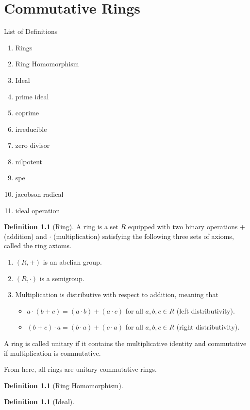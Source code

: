 \documentclass{book}
\theoremstyle{plain}
\theoremstyle{definition}
\theoremstyle{custom_definition}
\newtheorem{defn}[thm]{Definition}
\begin{document}
%
%
%
\chapter{Commutative Rings}

List of Definitions
\begin{enumerate}
  \item Rings
  \item Ring Homomorphism
  \item Ideal
  \item prime ideal
  \item coprime
  \item irreducible
  \item zero divisor
  \item nilpotent
  \item spe
  \item jacobson radical
  \item ideal operation
\end{enumerate}

\begin{defn}[Ring]
  A ring is a set \(R\) equipped with two binary operations \(+\) (addition) and \(\cdot\) (multiplication) satisfying the following three sets of axioms, called the ring axioms.
  \begin{enumerate}
    \item \((R, +)\) is an abelian group.
    \item \((R, \cdot)\) is a semigroup.
    \item Multiplication is distributive with respect to addition, meaning that
    \begin{itemize}
      \item \(a \cdot (b + c) = (a \cdot b) + (a \cdot c)\) for all \(a, b, c \in R\) (left distributivity).
      \item \((b + c) \cdot a = (b \cdot a) + (c \cdot a)\) for all \(a, b, c \in R\) (right distributivity).
    \end{itemize}
  \end{enumerate}
  A ring is called unitary if it contains the multiplicative identity and commutative if multiplication is commutative.
\end{defn}
From here, all rings are unitary commutative rings.

\begin{defn}[Ring Homomorphism]
\end{defn}

\begin{defn}[Ideal]
\end{defn}
\end{document}

